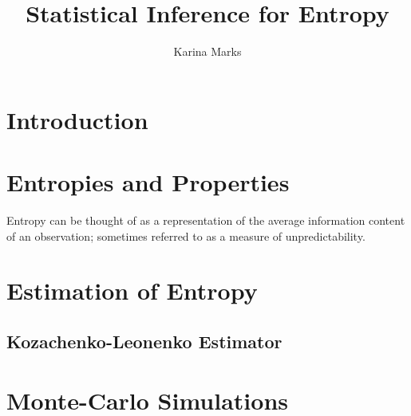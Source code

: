 \documentclass{article}
\title{Statistical Inference for Entropy}
\author{Karina Marks}
\begin{document}
\maketitle
\section{Introduction}


\section{Entropies and Properties}
Entropy can be thought of as a representation of the average information content of an observation; sometimes referred to as a measure of unpredictability.

\section{Estimation of Entropy}

\subsection{Kozachenko-Leonenko Estimator}


\section{Monte-Carlo Simulations}
\end{document}
